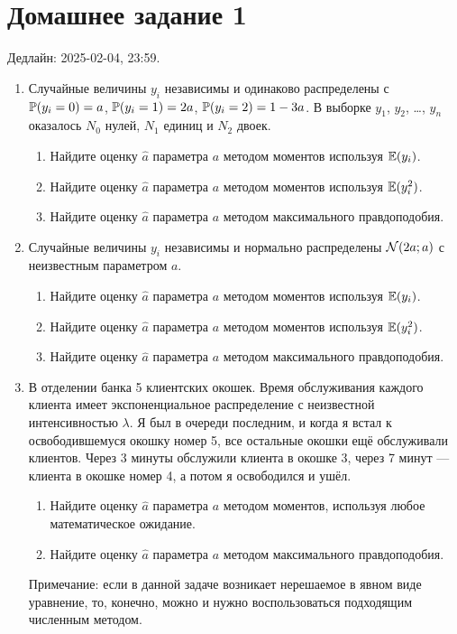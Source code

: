 \section*{Домашнее задание 1}

Дедлайн: 2025-02-04, 23:59.

\begin{enumerate}
    \item Случайные величины $y_i$ независимы и одинаково распределены с $\P(y_i = 0) = a$, $\P(y_i = 1) = 2a$, $\P(y_i = 2) = 1 - 3a$.
    В выборке $y_1$, $y_2$, \dots, $y_n$ оказалось $N_0$ нулей, $N_1$ единиц и $N_2$ двоек. 
    \begin{enumerate}
        \item Найдите оценку $\hat a$ параметра $a$ методом моментов используя $\E(y_i)$.
        \item Найдите оценку $\hat a$ параметра $a$ методом моментов используя $\E(y_i^2)$.
        \item Найдите оценку $\hat a$ параметра $a$ методом максимального правдоподобия.
    \end{enumerate}
    

\item Случайные величины $y_i$ независимы и нормально распределены $\cN(2a; a)$ с неизвестным параметром $a$.
\begin{enumerate}
    \item Найдите оценку $\hat a$ параметра $a$ методом моментов используя $\E(y_i)$.
    \item Найдите оценку $\hat a$ параметра $a$ методом моментов используя $\E(y_i^2)$.
    \item Найдите оценку $\hat a$ параметра $a$ методом максимального правдоподобия.
\end{enumerate}

\item В отделении банка 5 клиентских окошек. 
Время обслуживания каждого клиента имеет экспоненциальное распределение с неизвестной интенсивностью $\lambda$. 
Я был в очереди последним, и когда я встал к освободившемуся окошку номер 5, все остальные окошки ещё обслуживали клиентов. 
Через 3 минуты обслужили клиента в окошке 3, через 7 минут — клиента в окошке номер 4, 
а потом я освободился и ушёл. 

\begin{enumerate}
    \item Найдите оценку $\hat a$ параметра $a$ методом моментов, используя любое математическое ожидание. 
    \item Найдите оценку $\hat a$ параметра $a$ методом максимального правдоподобия.
\end{enumerate}

Примечание: если в данной задаче возникает нерешаемое в явном виде уравнение, то, конечно, можно и нужно воспользоваться подходящим численным методом. 

\end{enumerate}
